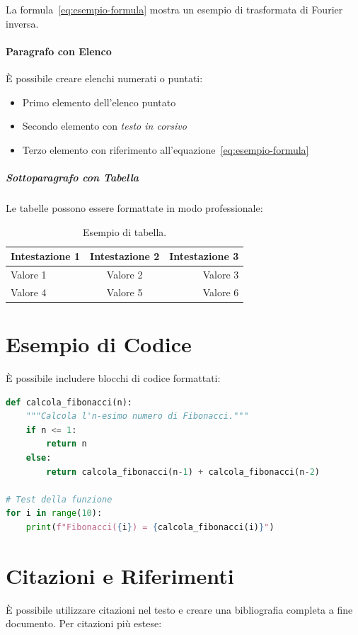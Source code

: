 La formula~\ref{eq:esempio-formula} mostra un esempio di trasformata di Fourier inversa.

\paragraph{Paragrafo con Elenco}
È possibile creare elenchi numerati o puntati:

\begin{itemize}
    \item Primo elemento dell'elenco puntato
    \item Secondo elemento con \textit{testo in corsivo}
    \item Terzo elemento con riferimento all'equazione~\ref{eq:esempio-formula}
\end{itemize}

\subparagraph{Sottoparagrafo con Tabella}
Le tabelle possono essere formattate in modo professionale:

\begin{table}[htbp]
    \centering
    \caption{Esempio di tabella.}
    \label{tab:esempio-tabella}
    \begin{tabular}{lcr}
        \toprule
        \textbf{Intestazione 1} & \textbf{Intestazione 2} & \textbf{Intestazione 3} \\
        \midrule
        Valore 1 & Valore 2 & Valore 3 \\
        Valore 4 & Valore 5 & Valore 6 \\
        \bottomrule
    \end{tabular}
\end{table}

\section{Esempio di Codice}
È possibile includere blocchi di codice formattati:

\begin{lstlisting}[language=Python, caption=Esempio di codice Python]
def calcola_fibonacci(n):
    """Calcola l'n-esimo numero di Fibonacci."""
    if n <= 1:
        return n
    else:
        return calcola_fibonacci(n-1) + calcola_fibonacci(n-2)
        
# Test della funzione
for i in range(10):
    print(f"Fibonacci({i}) = {calcola_fibonacci(i)}")
\end{lstlisting}

\section{Citazioni e Riferimenti}
È possibile utilizzare citazioni nel testo \cite{riferimento1} e creare una bibliografia completa a fine documento. Per citazioni più estese:

